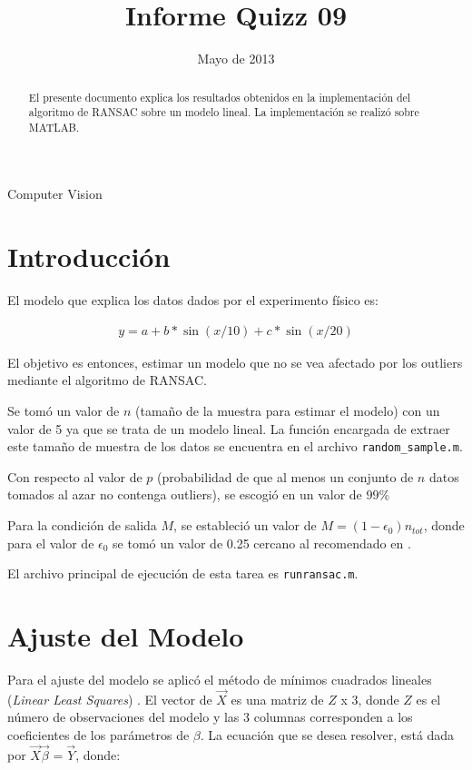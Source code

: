 \documentclass{IEEEtran}
\begin{document}
\title{Informe Quizz 09}
\date {Mayo de 2013}
\author{
}
\maketitle


\begin{abstract}
El presente documento explica los resultados obtenidos en la implementación del algoritmo
de RANSAC sobre un modelo lineal. La implementación se realizó sobre MATLAB.
\end{abstract}

\begin{IEEEkeywords}
Computer Vision
\end{IEEEkeywords}

\section{Introducción}
El modelo que explica los datos dados por el experimento físico es:

\begin{equation}
\begin{aligned}
y = a + b * \sin(x/10) + c*\sin(x/20)
\end{aligned}
\end{equation} 

El objetivo es entonces, estimar un modelo que no se vea afectado por los outliers
mediante el algoritmo de RANSAC.

Se tomó un valor de $n$ (tamaño de la muestra para estimar el modelo)
con un valor de 5 ya que se trata de un modelo lineal. La función
encargada de extraer este tamaño de muestra de los datos se encuentra
en el archivo \verb+random_sample.m+.

Con respecto al valor de $p$ (probabilidad de que al menos un conjunto de
$n$ datos tomados al azar no contenga outliers), se escogió en un valor
de $99\%$

Para la condición de salida $M$, se estableció un valor de 
$M = (1-\epsilon_0)n_{tot}$, donde para el valor de $\epsilon_0$
se tomó un valor de 0.25 cercano al recomendado en \cite{hartley2000multiple}.

El archivo principal de ejecución de esta tarea es \verb+runransac.m+.

\section{Ajuste del Modelo}
Para el ajuste del modelo se aplicó el método de mínimos cuadrados lineales 
(\textit{Linear Least Squares}) \cite{lls}.
El vector de $\vec{X}$ es una matriz de $Z$ x $3$, donde $Z$ es el número de observaciones
del modelo y las 3 columnas corresponden a los coeficientes de los parámetros de $\beta$.
La ecuación que se desea resolver, está dada por $\vec{X}\vec{\beta}=\vec{Y}$, donde:
\end{document}
